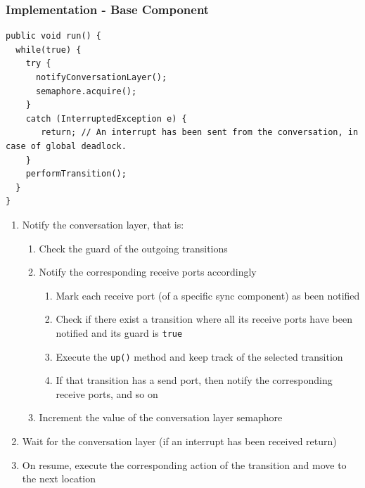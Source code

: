 \documentclass[compress,xcolor=dvipsnames,10pt]{beamer}
\begin{document}
\begin{frame}[fragile]
 \frametitle{Implementation - Base Component}

       \begin{lstlisting}[style=customjava, basicstyle=\ttfamily\tiny]
public void run() {
  while(true) {
    try {
      notifyConversationLayer();
      semaphore.acquire();
    }
    catch (InterruptedException e) {
       return; // An interrupt has been sent from the conversation, in case of global deadlock. 
    }
    performTransition();
  }
}
\end{lstlisting}
\begin{enumerate}
\item Notify the conversation layer, that is:
\begin{enumerate}
\item Check the guard of the outgoing transitions 
\item Notify the corresponding receive ports accordingly
\begin{enumerate}
 \item Mark each receive port (of a specific sync component) as been notified
 \item Check if there exist a transition where all its receive ports have been notified and its guard is \texttt{true}
 \item Execute the \texttt{up()} method and keep track of the selected transition
 \item If that transition has a send port, then notify the corresponding receive ports, and so on
\end{enumerate}
\item Increment the value of the conversation layer semaphore
\end{enumerate}
\item Wait for the conversation layer (if an interrupt has been received return) 
\item On resume, execute the corresponding action of the transition and move to the next location
\end{enumerate}

\end{frame}
\end{document}

